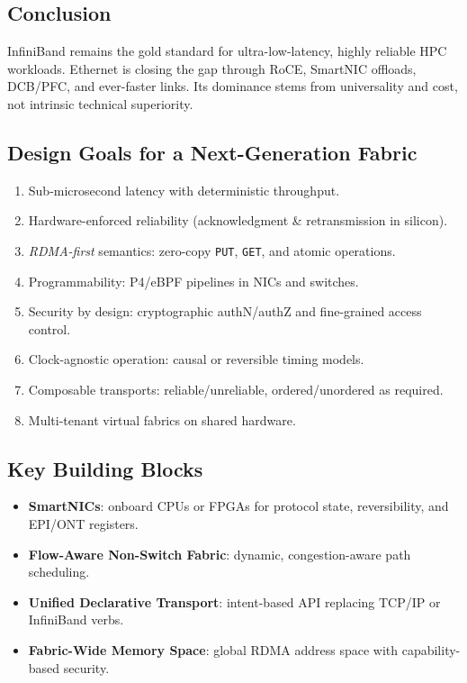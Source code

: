 \documentclass[../../../OAE-SPEC-MAIN.tex]{subfiles}
\begin{document}
\subsection{Conclusion}
InfiniBand remains the gold standard for ultra-low-latency, highly
reliable HPC workloads.  Ethernet is closing the gap through RoCE,
SmartNIC offloads, DCB/PFC, and ever-faster links.  Its dominance stems
from universality and cost, not intrinsic technical superiority.

\subsection{Design Goals for a Next-Generation Fabric}
\begin{enumerate}
  \item Sub-microsecond latency with deterministic throughput.
  \item Hardware-enforced reliability (acknowledgment \& retransmission
        in silicon).
  \item \emph{RDMA-first} semantics: zero-copy \texttt{PUT}, \texttt{GET},
        and atomic operations.
  \item Programmability: P4/eBPF pipelines in NICs and switches.
  \item Security by design: cryptographic authN/authZ and fine-grained
        access control.
  \item Clock-agnostic operation: causal or reversible timing models.
  \item Composable transports: reliable/unreliable, ordered/unordered
        as required.
  \item Multi-tenant virtual fabrics on shared hardware.
\end{enumerate}

\subsection{Key Building Blocks}
\begin{itemize}
  \item \textbf{SmartNICs}: onboard CPUs or FPGAs for protocol state,
        reversibility, and EPI/ONT registers.
  \item \textbf{Flow-Aware Non-Switch Fabric}: dynamic,
        congestion-aware path scheduling.
  \item \textbf{Unified Declarative Transport}: intent-based API
        replacing TCP/IP or InfiniBand verbs.
  \item \textbf{Fabric-Wide Memory Space}: global RDMA address space
        with capability-based security.
\end{itemize}
\end{document}
